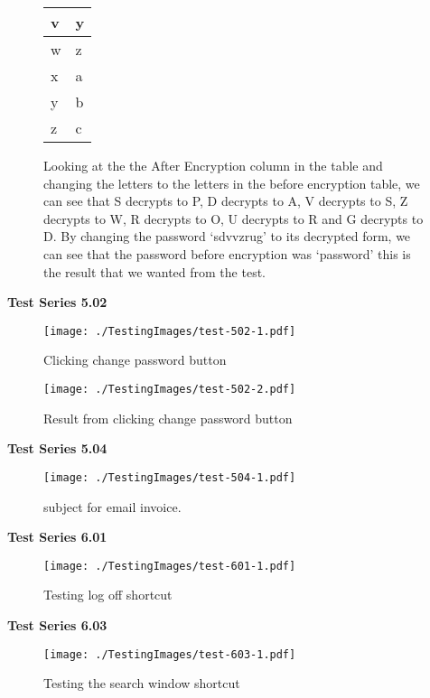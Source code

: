 \begin{figure}[H]
\begin{center}
\begin{tabular}{|p{3.5cm}|p{3.5cm}|}
        v & y\\ \hline
      \rowcolor{light-grey}  w & z\\ \hline
        x & a\\ \hline
        y & b\\ \hline
        z & c\\ \hline
 \end{tabular}
 \end{center}
 \vspace{5mm}
 Looking at the the After Encryption column in the table and changing the letters to the letters in the before encryption table,  we can see that S decrypts to P, D decrypts to A, V decrypts to S, Z decrypts to W, R decrypts to O, U decrypts to R and G decrypts to D. By changing the password `sdvvzrug' to its decrypted form, we can see that the password before encryption was `password' this is the result that we wanted from the test.
\end{figure}

\textbf{Test Series 5.02}

\begin{figure}[H]
    \texttt{[image: ./TestingImages/test-502-1.pdf]}
    \caption{Clicking change password button} \label{fig:test-502-1}
\end{figure}

\begin{figure}[H]
    \texttt{[image: ./TestingImages/test-502-2.pdf]}
    \caption{Result from clicking change password button} \label{fig:test-502-2}
\end{figure}

\textbf{Test Series 5.04}

\begin{figure}[H]
    \texttt{[image: ./TestingImages/test-504-1.pdf]}
    \caption{subject for email invoice.} \label{fig:test-504-1}
\end{figure}

\textbf{Test Series 6.01}

\begin{figure}[H]
    \texttt{[image: ./TestingImages/test-601-1.pdf]}
    \caption{Testing log off shortcut} \label{fig:test-601-1}
\end{figure}


\textbf{Test Series 6.03}

\begin{figure}[H]
    \texttt{[image: ./TestingImages/test-603-1.pdf]}
    \caption{Testing the search window shortcut} \label{fig:test-603-1}
\end{figure}

